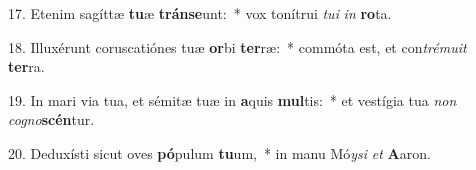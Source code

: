 17. Etenim sagíttæ \textbf{tu}æ \textbf{tráns}\textbf{e}unt:~*  vox tonítrui \textit{tu}\textit{i} \textit{in} \textbf{ro}ta.\

18. Illuxérunt coruscatiónes tuæ \textbf{or}bi \textbf{ter}ræ:~*  commóta est, et con\textit{tré}\textit{mu}\textit{it} \textbf{ter}ra.\

19. In mari via tua, et sémitæ tuæ in \textbf{a}quis \textbf{mul}tis:~*  et vestígia tua \textit{non} \textit{co}\textit{gno}\textbf{scén}tur.\

20. Deduxísti sicut oves \textbf{pó}pulum \textbf{tu}um,~*  in manu Mó\textit{y}\textit{si} \textit{et} \textbf{A}aron.\

